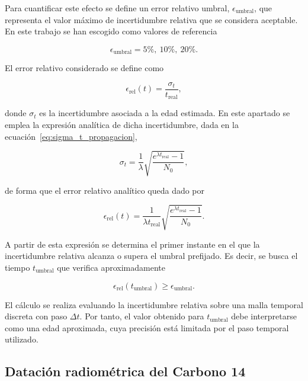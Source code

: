 \documentclass[12pt,a4paper]{article}
\begin{document}
Para cuantificar este efecto se define un error relativo umbral, $\epsilon_{\mathrm{umbral}}$, que representa el valor máximo de incertidumbre relativa que se considera aceptable. En este trabajo se han escogido como valores de referencia

\begin{equation}
\epsilon_{\mathrm{umbral}} = 5\%,\ 10\%,\ 20\%.
\end{equation}

El error relativo considerado se define como

\begin{equation}
\epsilon_{\mathrm{rel}}(t)=\frac{\sigma_t}{t_{\mathrm{real}}},
\end{equation}

donde $\sigma_t$ es la incertidumbre asociada a la edad estimada. En este apartado se emplea la expresión analítica de dicha incertidumbre, dada en la ecuación~\ref{eq:sigma_t_propagacion},

\begin{equation}
\sigma_t =
\frac{1}{\lambda}
\sqrt{
\frac{e^{\lambda t_{\mathrm{real}}}-1}{N_0}
},
\end{equation}

de forma que el error relativo analítico queda dado por

\begin{equation}
\epsilon_{\mathrm{rel}}(t)=
\frac{1}{\lambda t_{\mathrm{real}}}
\sqrt{
\frac{e^{\lambda t_{\mathrm{real}}}-1}{N_0}
}.
\label{eq:incertidumbre_relativa}
\end{equation}

A partir de esta expresión se determina el primer instante en el que la incertidumbre relativa alcanza o supera el umbral prefijado. Es decir, se busca el tiempo $t_{\mathrm{umbral}}$ que verifica aproximadamente

\begin{equation}
\epsilon_{\mathrm{rel}}(t_{\mathrm{umbral}}) \geq \epsilon_{\mathrm{umbral}}.
\end{equation}

El cálculo se realiza evaluando la incertidumbre relativa sobre una malla temporal discreta con paso $\Delta t$. Por tanto, el valor obtenido para $t_{\mathrm{umbral}}$ debe interpretarse como una edad aproximada, cuya precisión está limitada por el paso temporal utilizado.


\subsection{Datación radiométrica del Carbono 14}
\end{document}
